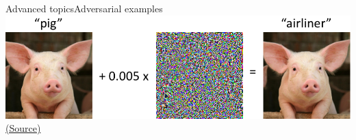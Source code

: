 \documentclass[10pt,compress]{beamer} %
\begin{document}
\begin{frame}{Advanced topics}{Adversarial examples}
	\centering\includegraphics[width=0.7\linewidth]{figs/adversarial.png}\\
	\scriptsize\href{https://medium.com/attentive-ai/fooling-cnns-via-adversarial-examples-877a9e0ee84e}{(Source)}
\end{frame}
\end{document}
